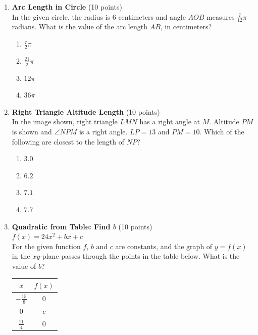 \begin{enumerate}
  \item \textbf{Arc Length in Circle} (10 points)\\
  In the given circle, the radius is 6 centimeters and angle $AOB$ measures $\frac{7}{12}\pi$ radians. What is the value of the arc length $AB$, in centimeters?
  \begin{enumerate}[label=\Alph*.]
    \item $\frac{7}{2}\pi$
    \item $\frac{21}{2}\pi$
    \item $12\pi$
    \item $36\pi$
  \end{enumerate}
  \begin{subanswer}
  \end{subanswer}

  \newpage

  \item \textbf{Right Triangle Altitude Length} (10 points)\\
  In the image shown, right triangle $LMN$ has a right angle at $M$. Altitude $PM$ is shown and $\angle NPM$ is a right angle. $LP=13$ and $PM=10$. Which of the following are closest to the length of $NP$?
  \begin{enumerate}[label=\Alph*.]
    \item $3.0$
    \item $6.2$
    \item $7.1$
    \item $7.7$
  \end{enumerate}
  \begin{subanswer}
  \end{subanswer}

  \item \textbf{Quadratic from Table: Find $b$} (10 points)\\
  $f(x)=24x^2+bx+c$\\
  For the given function $f$, $b$ and $c$ are constants, and the graph of $y=f(x)$ in the $xy$-plane passes through the points in the table below. What is the value of $b$?
  \begin{table}[h!]
  \centering
  \renewcommand{\arraystretch}{1.3}
  \setlength{\tabcolsep}{16pt}
  \begin{tabular}{|c|c|}
  \hline $x$ & $f(x)$ \\
  \hline $-\frac{15}{8}$ & 0 \\
  \hline 0 & $c$ \\
  \hline $\frac{11}{4}$ & 0 \\
  \hline
  \end{tabular}
  \end{table}
  \begin{subanswer}
  \end{subanswer}


\end{enumerate}
